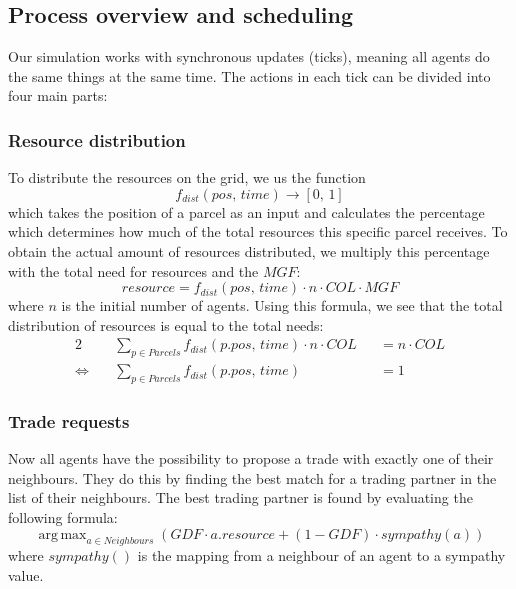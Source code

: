 \documentclass{JASSS}
\DeclareMathOperator*{\argmax}{arg\,max}
\newcommand{\gdf}{\mathit{GDF}}
\newcommand{\col}{\mathit{COL}}
\newcommand{\mgf}{\mathit{MGF}}
\begin{document}
\subsection{Process overview and scheduling}
Our simulation works with synchronous updates (ticks), meaning all agents do the same things at the same time. The actions in each tick can be divided into four main parts:

\subsubsection{Resource distribution}
	To distribute the resources on the grid, we us the function
	\begin{equation}
		f_\mathit{dist}(\mathit{pos},\, \mathit{time}) \to [0,\, 1]
	\end{equation}
	which takes the position of a parcel as an input and calculates the percentage which determines how much of the total resources this specific parcel receives. To obtain the actual amount of resources distributed, we multiply this percentage with the total need for resources and the $\mgf$:
	\begin{equation}
		resource = f_\mathit{dist}(\mathit{pos},\, \mathit{time}) \cdot n \cdot \col \cdot \mgf
	\end{equation}
	where $n$ is the initial number of agents. Using this formula, we see that the total distribution of resources is equal to the total needs:
	\begin{alignat}{2}
		&\sum_{p \in \mathit{Parcels}} f_\mathit{dist}(\mathit{p.pos},\, \mathit{time}) \cdot n \cdot \col &&= n \cdot \col\\
		\Longleftrightarrow \quad &\sum_{p \in \mathit{Parcels}} f_\mathit{dist}(\mathit{p.pos},\, \mathit{time}) &&= 1
	\end{alignat}
	
\subsubsection{Trade requests}
	Now all agents have the possibility to propose a trade with exactly one of their neighbours. They do this by finding the best match for a trading partner in the list of their neighbours. The best trading partner is found by evaluating the following formula:
	\begin{equation}\label{eq: trade_req}
		\argmax_{a \in \mathit{Neighbours}} \left( \gdf \cdot a.\mathit{resource} + (1-\gdf) \cdot \mathit{sympathy}(a) \right)
	\end{equation}
	where $sympathy()$ is the mapping from a neighbour of an agent to a sympathy value.
	
\end{document}
